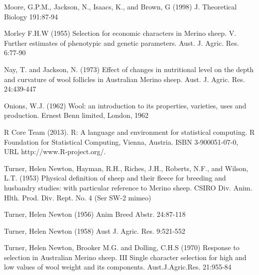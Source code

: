 \documentclass[titlepage]{article}  %
\begin{document}
\begin{thebibliography}{99}
Moore, G.P.M., Jackson, N., Isaacs, K., and Brown, G (1998) J. Theoretical Biology 191:87-94

Morley F.H.W (1955) Selection for economic characters in Merino sheep. V. Further estimates of phenotypic and genetic parameters. Aust. J. Agric. Res. 6:77-90

Nay, T. and Jackson, N. (1973) Effect of changes in nutritional level on the depth and curvature of wool follicles in Australian Merino sheep. Aust. J. Agric. Res. 24:439-447

Onions, W.J. (1962) Wool: an introduction to its properties, varieties, uses
     and production. Ernest Benn limited, London, 1962

R Core Team (2013). R: A language and environment for statistical
  computing. R Foundation for Statistical Computing, Vienna, Austria.
  ISBN 3-900051-07-0, URL http://www.R-project.org/.

Turner, Helen Newton, Hayman, R.H., Riches, J.H., Roberts, N.F., and Wilson, L.T. (1953) Physical definition of sheep and their fleece for breeding and husbandry studies: with particular reference to Merino sheep. CSIRO Div. Anim. Hlth. Prod. Div. Rept. No. 4 (Ser SW-2 mimeo)

Turner, Helen Newton (1956) Anim Breed Abstr. 24:87-118

Turner, Helen Newton (1958) Aust J. Agric. Res. 9:521-552

Turner, Helen Newton, Brooker M.G. and Dolling, C.H.S (1970) Response to selection in Australian Merino sheep. III Single character selection for high and low values of wool weight and its components. Aust.J.Agric.Res. 21:955-84
\end{thebibliography}
\end{document}
